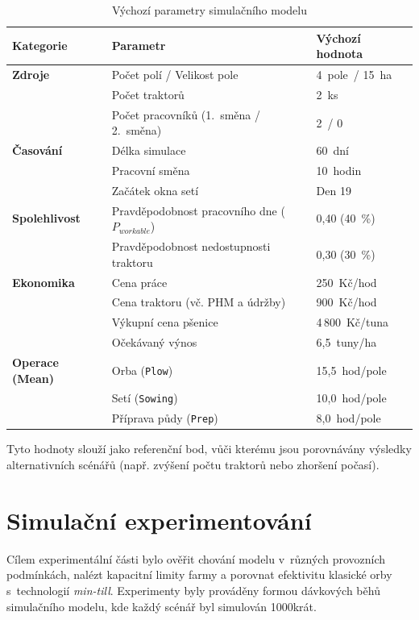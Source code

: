 \documentclass[11pt,a4paper]{article}
\begin{document}
\begin{table}[H]
    \centering
    \begin{tabularx}{\linewidth}{@{}lXl@{}}
        \toprule
        \textbf{Kategorie} & \textbf{Parametr} & \textbf{Výchozí hodnota} \\
        \midrule
        \textbf{Zdroje} & Počet polí / Velikost pole & 4~pole~/ 15~ha \\
        & Počet traktorů & 2~ks \\
        & Počet pracovníků (1.~směna / 2.~směna) & 2~/ 0 \\
        \midrule
        \textbf{Časování} & Délka simulace & 60~dní \\
        & Pracovní směna & 10~hodin \\
        & Začátek okna setí & Den 19 \\
        \midrule
        \textbf{Spolehlivost} & Pravděpodobnost pracovního dne ($P_{workable}$) & 0,40 (40~\%) \\
        & Pravděpodobnost nedostupnosti traktoru & 0,30 (30~\%) \\
        \midrule
        \textbf{Ekonomika} & Cena práce & 250~Kč/hod \\
        & Cena traktoru (vč. PHM a údržby) & 900~Kč/hod \\
        & Výkupní cena pšenice & 4\,800~Kč/tuna \\
        & Očekávaný výnos & 6,5~tuny/ha \\
        \midrule
        \textbf{Operace (Mean)} & Orba (\texttt{Plow}) & 15,5~hod/pole \\
        & Setí (\texttt{Sowing}) & 10,0~hod/pole \\
        & Příprava půdy (\texttt{Prep}) & 8,0~hod/pole \\
        \bottomrule
    \end{tabularx}
    \caption{Výchozí parametry simulačního modelu}
    \label{tab:model-defaults}
\end{table}

Tyto hodnoty slouží jako referenční bod, vůči kterému jsou porovnávány výsledky alternativních scénářů (např. zvýšení počtu traktorů nebo zhoršení počasí).

\section{Simulační experimentování}\label{sec:experimenty}

Cílem experimentální části bylo ověřit chování modelu v~různých provozních podmínkách, nalézt kapacitní limity farmy a porovnat efektivitu klasické orby s~technologií \emph{min-till}. Experimenty byly prováděny formou dávkových běhů simulačního modelu, kde každý scénář byl simulován 1000krát.
\end{document}
